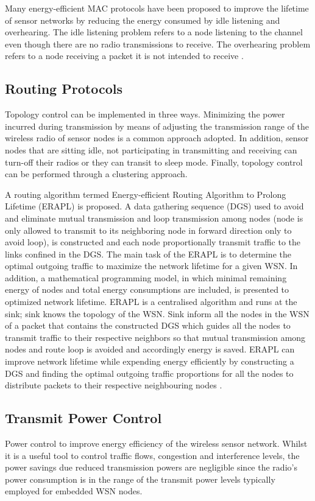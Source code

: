 Many energy-efficient MAC protocols have been proposed to improve the lifetime of sensor networks by reducing the energy consumed by idle listening and overhearing. The idle listening problem refers to a node listening to the channel even though there are no radio transmissions to receive. The overhearing problem refers to a node receiving a packet it is not intended to receive \cite{pwmac}. 

\subsection{Routing Protocols}
Topology control can be implemented in three ways. Minimizing the power incurred during transmission by means of adjusting the transmission range of the wireless radio of sensor nodes is a common approach adopted. In addition, sensor nodes that are sitting idle, not participating in transmitting and receiving can turn-off their radios or they can transit to sleep mode. Finally, topology control can be performed through a clustering approach. \cite{azrinasurvey}

A routing algorithm termed Energy-efficient Routing Algorithm to Prolong Lifetime (ERAPL) is proposed. A data gathering sequence (DGS) used to avoid and eliminate mutual transmission and loop transmission among nodes (node is only allowed to transmit to its neighboring node in forward direction only to avoid loop), is constructed and each node proportionally transmit traffic to the links confined in the DGS. The main task of the ERAPL is to determine the optimal outgoing traffic to maximize the network lifetime for a given WSN. In addition, a mathematical programming model, in which minimal remaining energy of nodes and total energy consumptions are included, is presented to optimized network lifetime. ERAPL is a centralised algorithm and runs at the sink; sink knows the topology of the WSN. Sink inform all the nodes in the WSN of a packet that contains the constructed DGS which guides all the nodes to transmit traffic to their respective neighbors so that mutual transmission among nodes and route loop is avoided and accordingly energy is saved. ERAPL can improve network lifetime while expending energy efficiently by constructing a DGS and finding the optimal outgoing traffic proportions for all the nodes to distribute packets to their respective neighbouring nodes \cite{erapl}. 

\subsection{Transmit Power Control}
Power control to improve energy efficiency of the wireless sensor network. Whilst it is a useful tool to control traffic flows, congestion and interference levels, the power savings due reduced transmission powers are negligible since the radio's power consumption is in the range of the transmit power levels typically employed for embedded WSN nodes. \cite{macsurvey}

